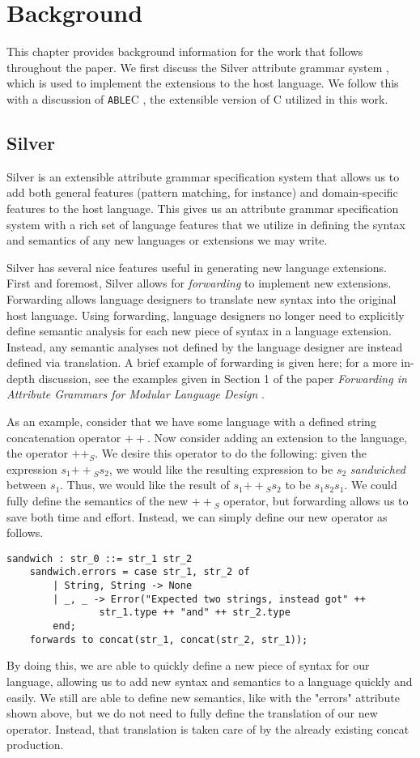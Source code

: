 \documentclass[main.tex]{subfiles}
\begin{document}
\section{Background}

This chapter provides background information for the work that follows
throughout the paper. We first discuss the Silver attribute grammar system 
\cite{3}, which is used to implement the extensions to the host language.
We follow this with a discussion of \verb|ABLE|C \cite{9}, the extensible
version of C utilized in this work.

\subsection{Silver} %
Silver \cite{3} is an extensible attribute grammar specification system that allows us to 
add both general features (pattern matching, for instance) and domain-specific features
to the host language. This gives us an attribute grammar specification system with a rich
set of language features that we utilize in defining the syntax and semantics of any new 
languages or extensions we may write.

Silver has several nice features useful in generating new language extensions.
First and foremost, Silver allows for \emph{forwarding} \cite{4} to 
implement new extensions. Forwarding allows language
designers to translate new syntax into the original host language. Using forwarding,
language designers no longer need to explicitly define semantic analysis for each new
piece of syntax in a language extension. Instead, any semantic analyses not defined
by the language designer are instead defined via translation. A brief example of forwarding is 
given here; for a more in-depth discussion, see the examples given in Section 1 of the paper 
\emph{Forwarding in Attribute Grammars for Modular Language Design} \cite{4}.

As an example, consider that we have some language with a defined string concatenation operator $++$.
Now consider adding an extension to the language, the operator $++_S$. We desire this operator to do
the following: given the expression $s_1 {++}_S s_2$, we would like the resulting expression to be $s_2$
\emph{sandwiched} between $s_1$. Thus, we would like the result of $s_1 {++}_S s_2$ to be $s_1 s_2 s_1$.
We could fully define the semantics of the new ${++}_S$ operator, but forwarding allows us to save both time and
effort. Instead, we can simply define our new operator as follows.
\begin{lstlisting}
sandwich : str_0 ::= str_1 str_2
	sandwich.errors = case str_1, str_2 of
		| String, String -> None
		| _, _ -> Error("Expected two strings, instead got" ++ 
				str_1.type ++ "and" ++ str_2.type
		end;
	forwards to concat(str_1, concat(str_2, str_1));
\end{lstlisting}
By doing this, we are able to quickly define a new piece of syntax for our language, allowing us to add new
syntax and semantics to a language quickly and easily. We still are able to define new semantics, like with the
"errors" attribute shown above, but we do not need to fully define the translation of our new operator. Instead,
that translation is taken care of by the already existing concat production.
\end{document}
